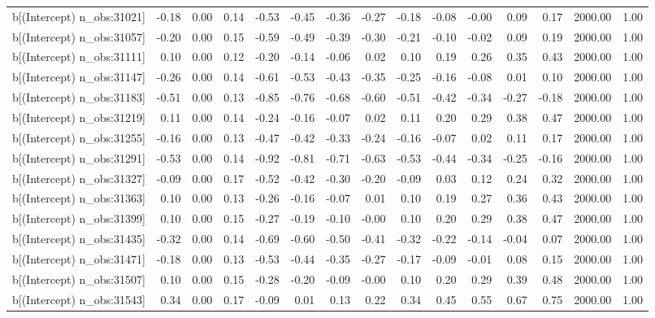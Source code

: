 \begin{table}[ht]
\begin{tabular}{rrrrrrrrrrrrrrr}
  b[(Intercept) n\_obs:31021] & -0.18 & 0.00 & 0.14 & -0.53 & -0.45 & -0.36 & -0.27 & -0.18 & -0.08 & -0.00 & 0.09 & 0.17 & 2000.00 & 1.00 \\ 
  b[(Intercept) n\_obs:31057] & -0.20 & 0.00 & 0.15 & -0.59 & -0.49 & -0.39 & -0.30 & -0.21 & -0.10 & -0.02 & 0.09 & 0.19 & 2000.00 & 1.00 \\ 
  b[(Intercept) n\_obs:31111] & 0.10 & 0.00 & 0.12 & -0.20 & -0.14 & -0.06 & 0.02 & 0.10 & 0.19 & 0.26 & 0.35 & 0.43 & 2000.00 & 1.00 \\ 
  b[(Intercept) n\_obs:31147] & -0.26 & 0.00 & 0.14 & -0.61 & -0.53 & -0.43 & -0.35 & -0.25 & -0.16 & -0.08 & 0.01 & 0.10 & 2000.00 & 1.00 \\ 
  b[(Intercept) n\_obs:31183] & -0.51 & 0.00 & 0.13 & -0.85 & -0.76 & -0.68 & -0.60 & -0.51 & -0.42 & -0.34 & -0.27 & -0.18 & 2000.00 & 1.00 \\ 
  b[(Intercept) n\_obs:31219] & 0.11 & 0.00 & 0.14 & -0.24 & -0.16 & -0.07 & 0.02 & 0.11 & 0.20 & 0.29 & 0.38 & 0.47 & 2000.00 & 1.00 \\ 
  b[(Intercept) n\_obs:31255] & -0.16 & 0.00 & 0.13 & -0.47 & -0.42 & -0.33 & -0.24 & -0.16 & -0.07 & 0.02 & 0.11 & 0.17 & 2000.00 & 1.00 \\ 
  b[(Intercept) n\_obs:31291] & -0.53 & 0.00 & 0.14 & -0.92 & -0.81 & -0.71 & -0.63 & -0.53 & -0.44 & -0.34 & -0.25 & -0.16 & 2000.00 & 1.00 \\ 
  b[(Intercept) n\_obs:31327] & -0.09 & 0.00 & 0.17 & -0.52 & -0.42 & -0.30 & -0.20 & -0.09 & 0.03 & 0.12 & 0.24 & 0.32 & 2000.00 & 1.00 \\ 
  b[(Intercept) n\_obs:31363] & 0.10 & 0.00 & 0.13 & -0.26 & -0.16 & -0.07 & 0.01 & 0.10 & 0.19 & 0.27 & 0.36 & 0.43 & 2000.00 & 1.00 \\ 
  b[(Intercept) n\_obs:31399] & 0.10 & 0.00 & 0.15 & -0.27 & -0.19 & -0.10 & -0.00 & 0.10 & 0.20 & 0.29 & 0.38 & 0.47 & 2000.00 & 1.00 \\ 
  b[(Intercept) n\_obs:31435] & -0.32 & 0.00 & 0.14 & -0.69 & -0.60 & -0.50 & -0.41 & -0.32 & -0.22 & -0.14 & -0.04 & 0.07 & 2000.00 & 1.00 \\ 
  b[(Intercept) n\_obs:31471] & -0.18 & 0.00 & 0.13 & -0.53 & -0.44 & -0.35 & -0.27 & -0.17 & -0.09 & -0.01 & 0.08 & 0.15 & 2000.00 & 1.00 \\ 
  b[(Intercept) n\_obs:31507] & 0.10 & 0.00 & 0.15 & -0.28 & -0.20 & -0.09 & -0.00 & 0.10 & 0.20 & 0.29 & 0.39 & 0.48 & 2000.00 & 1.00 \\ 
  b[(Intercept) n\_obs:31543] & 0.34 & 0.00 & 0.17 & -0.09 & 0.01 & 0.13 & 0.22 & 0.34 & 0.45 & 0.55 & 0.67 & 0.75 & 2000.00 & 1.00 \\ 

\end{tabular}
\end{table}
